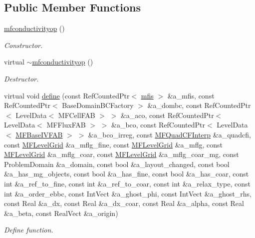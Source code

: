 \subsection*{Public Member Functions}
\begin{DoxyCompactItemize}
\item 
\hyperlink{classmfconductivityop_ac5fbfdd154912c1ff024ef84309aef80}{mfconductivityop} ()
\begin{DoxyCompactList}\small\item\em Constructor. \end{DoxyCompactList}\item 
virtual \hyperlink{classmfconductivityop_a0a9a072fbc8e43a21e1a1e5fe30816b4}{$\sim$mfconductivityop} ()
\begin{DoxyCompactList}\small\item\em Destructor. \end{DoxyCompactList}\item 
virtual void \hyperlink{classmfconductivityop_a746c869250ed94768dfb54eca4b39797}{define} (const Ref\+Counted\+Ptr$<$ \hyperlink{classmfis}{mfis} $>$ \&a\+\_\+mfis, const Ref\+Counted\+Ptr$<$ Base\+Domain\+B\+C\+Factory $>$ \&a\+\_\+dombc, const Ref\+Counted\+Ptr$<$ Level\+Data$<$ M\+F\+Cell\+F\+AB $>$ $>$ \&a\+\_\+aco, const Ref\+Counted\+Ptr$<$ Level\+Data$<$ M\+F\+Flux\+F\+AB $>$ $>$ \&a\+\_\+bco, const Ref\+Counted\+Ptr$<$ Level\+Data$<$ \hyperlink{classMFBaseIVFAB}{M\+F\+Base\+I\+V\+F\+AB} $>$ $>$ \&a\+\_\+bco\+\_\+irreg, const \hyperlink{classMFQuadCFInterp}{M\+F\+Quad\+C\+F\+Interp} \&a\+\_\+quadcfi, const \hyperlink{classMFLevelGrid}{M\+F\+Level\+Grid} \&a\+\_\+mflg\+\_\+fine, const \hyperlink{classMFLevelGrid}{M\+F\+Level\+Grid} \&a\+\_\+mflg, const \hyperlink{classMFLevelGrid}{M\+F\+Level\+Grid} \&a\+\_\+mflg\+\_\+coar, const \hyperlink{classMFLevelGrid}{M\+F\+Level\+Grid} \&a\+\_\+mflg\+\_\+coar\+\_\+mg, const Problem\+Domain \&a\+\_\+domain, const bool \&a\+\_\+layout\+\_\+changed, const bool \&a\+\_\+has\+\_\+mg\+\_\+objects, const bool \&a\+\_\+has\+\_\+fine, const bool \&a\+\_\+has\+\_\+coar, const int \&a\+\_\+ref\+\_\+to\+\_\+fine, const int \&a\+\_\+ref\+\_\+to\+\_\+coar, const int \&a\+\_\+relax\+\_\+type, const int \&a\+\_\+order\+\_\+ebbc, const Int\+Vect \&a\+\_\+ghost\+\_\+phi, const Int\+Vect \&a\+\_\+ghost\+\_\+rhs, const Real \&a\+\_\+dx, const Real \&a\+\_\+dx\+\_\+coar, const Real \&a\+\_\+alpha, const Real \&a\+\_\+beta, const Real\+Vect \&a\+\_\+origin)
\begin{DoxyCompactList}\small\item\em Define function. \end{DoxyCompactList}\item 

\end{DoxyCompactItemize}
